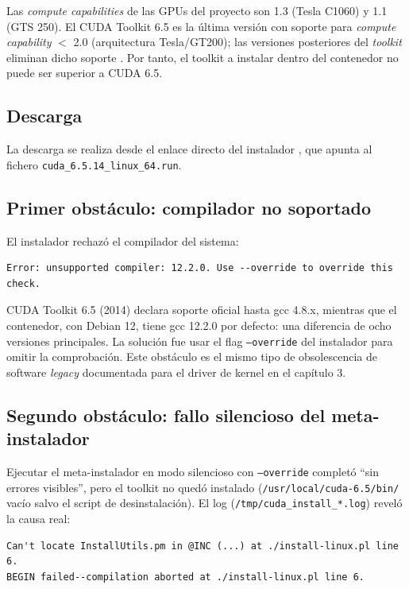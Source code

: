 Las \textit{compute capabilities} de las GPUs del proyecto son 1.3 (Tesla C1060) y 1.1 (GTS 250). El CUDA Toolkit 6.5 es la última versión con soporte para \textit{compute capability} $<$ 2.0 (arquitectura Tesla/GT200); las versiones posteriores del \textit{toolkit} eliminan dicho soporte \cite{nvidia_legacy_gpus}. Por tanto, el toolkit a instalar dentro del contenedor no puede ser superior a CUDA 6.5.

\subsection{Descarga}

La descarga se realiza desde el enlace directo del instalador \cite{cuda_65_archive}, que apunta al fichero \texttt{cuda\_6.5.14\_linux\_64.run}.

\subsection{Primer obstáculo: compilador no soportado}

El instalador rechazó el compilador del sistema:

\begin{lstlisting}[style=bash]
Error: unsupported compiler: 12.2.0. Use --override to override this check.
\end{lstlisting}

CUDA Toolkit 6.5 (2014) declara soporte oficial hasta gcc 4.8.x, mientras que el contenedor, con Debian 12, tiene gcc 12.2.0 por defecto: una diferencia de ocho versiones principales. La solución fue usar el flag \texttt{--override} del instalador para omitir la comprobación. Este obstáculo es el mismo tipo de obsolescencia de software \textit{legacy} documentada para el driver de kernel en el capítulo 3.

\subsection{Segundo obstáculo: fallo silencioso del meta-instalador}

Ejecutar el meta-instalador en modo silencioso con \texttt{--override} completó ``sin errores visibles'', pero el toolkit no quedó instalado (\texttt{/usr/local/cuda-6.5/bin/} vacío salvo el script de desinstalación). El log (\texttt{/tmp/cuda\_install\_*.log}) reveló la causa real:

\begin{lstlisting}[style=bash]
Can't locate InstallUtils.pm in @INC (...) at ./install-linux.pl line 6.
BEGIN failed--compilation aborted at ./install-linux.pl line 6.
\end{lstlisting}

